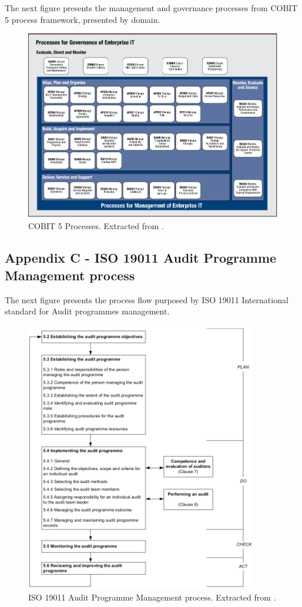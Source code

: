 The next figure presents the management and governance processes from COBIT 5 process framework, presented by domain.

\begin{figure}[h!]
\centering
\includegraphics[width=\textwidth]{img/COBIT5ProcessFramework.png}
\caption{COBIT 5 Processes. Extracted from \cite{2012cobit}.}
\end{figure}

\newpage

\subsection{Appendix C - ISO 19011 Audit Programme Management process} 

The next figure presents the process flow purposed by ISO 19011 International standard for Audit programmes management.

\begin{figure}[h!]
\centering
\includegraphics[width=0.9\textwidth]{img/ISO19011AuditProcess.png}
\caption{ISO 19011 Audit Programme Management process. Extracted from \cite{ISO19011}.}
\end{figure}




